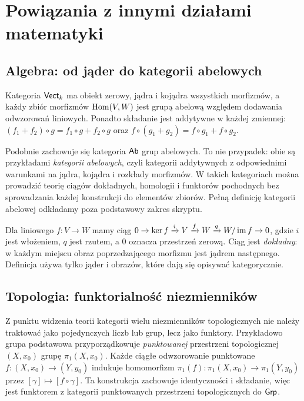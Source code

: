 \section{Powiązania z innymi działami matematyki}\label{sec:powiazania}

\subsection{Algebra: od jąder do kategorii abelowych}

Kategoria $\mathsf{Vect}_k$ ma obiekt zerowy, jądra i kojądra wszystkich morfizmów, a każdy zbiór morfizmów $\operatorname{Hom}(V,W)$ jest grupą abelową względem dodawania odwzorowań liniowych. Ponadto składanie jest addytywne w każdej zmiennej:
$(f_1+f_2)\circ g=f_1\circ g+f_2\circ g$ oraz $f\circ(g_1+g_2)=f\circ g_1+f\circ g_2$.

Podobnie zachowuje się kategoria $\mathsf{Ab}$ grup abelowych. To nie przypadek: obie są przykładami \emph{kategorii abelowych}, czyli kategorii addytywnych z odpowiednimi warunkami na jądra, kojądra i rozkłady morfizmów. W takich kategoriach można prowadzić teorię ciągów dokładnych, homologii i funktorów pochodnych bez sprowadzania każdej konstrukcji do elementów zbiorów. Pełną definicję kategorii abelowej odkładamy poza podstawowy zakres skryptu.

\begin{przyklad}
Dla liniowego $f:V\to W$ mamy ciąg $0\to\operatorname{ker} f\xrightarrow{i}V\xrightarrow{f}W\xrightarrow{q}W/\operatorname{im} f\to0$, gdzie $i$ jest włożeniem, $q$ jest rzutem, a $0$ oznacza przestrzeń zerową. Ciąg jest \emph{dokładny}: w każdym miejscu obraz poprzedzającego morfizmu jest jądrem następnego. Definicja używa tylko jąder i obrazów, które dają się opisywać kategorycznie.
\end{przyklad}

\subsection{Topologia: funktorialność niezmienników}

Z punktu widzenia teorii kategorii wielu niezmienników topologicznych nie należy traktować jako pojedynczych liczb lub grup, lecz jako funktory. Przykładowo grupa podstawowa przyporządkowuje \emph{punktowanej} przestrzeni topologicznej $(X,x_0)$ grupę $\pi_1(X,x_0)$. Każde ciągłe odwzorowanie punktowane $f:(X,x_0)\to(Y,y_0)$ indukuje homomorfizm $\pi_1(f):\pi_1(X,x_0)\to\pi_1(Y,y_0)$ przez $[\gamma]\mapsto[f\circ\gamma]$. Ta konstrukcja zachowuje identyczności i składanie, więc jest funktorem z kategorii punktowanych przestrzeni topologicznych do $\mathsf{Grp}$.

